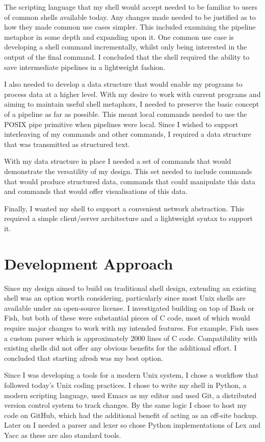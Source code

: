 \documentclass[12pt,twoside,notitlepage]{report}
\begin{document}
The scripting language that my shell would accept needed to be
familiar to users of common shells available today. Any changes made
needed to be justified as to how they made common use cases
simpler. This included examining the pipeline metaphor in some depth
and expanding upon it. One common use case is developing a shell
command incrementally, whilst only being interested in the output of
the final command. I concluded that the shell required the ability to
save intermediate pipelines in a lightweight fashion.

I also needed to develop a data structure that would enable my
programs to process data at a higher level. With my desire to work
with current programs and aiming to maintain useful shell metaphors, I
needed to preserve the basic concept of a pipeline as far as
possible. This meant local commands needed to use the POSIX pipe
primitive when pipelines were local. Since I wished to support
interleaving of my commands and other commands, I required a data
structure that was transmitted as structured text.

With my data structure in place I needed a set of commands that would
demonstrate the versatility of my design. This set needed to include commands
that would produce structured data, commands that could manipulate this data and
commands that would offer visualisations of this data.

Finally, I wanted my shell to support a convenient network abstraction. This
required a simple client/server architecture and a lightweight syntax to
support it.

\section{Development Approach}
Since my design aimed to build on traditional shell design, extending
an existing shell was an option worth considering, particularly since
most Unix shells are available under an open-source license. I
investigated building on top of Bash or Fish, but both of these were
substantial pieces of C code, most of which would require major
changes to work with my intended features. For example, Fish uses a
custom parser which is approximately 2000 lines of C code. Compatibility
with existing shells did not offer any obvious benefits for the
additional effort. I concluded that starting afresh was my best
option.

Since I was developing a tools for a modern Unix system, I chose a workflow that
followed today's Unix coding practices. I chose to write my shell in Python, a
modern scripting language, used Emacs as my editor and used Git, a distributed
version control system to track changes. By the same logic I chose to host my
code on GitHub, which had the additional benefit of acting as an off-site
backup. Later on I needed a parser and lexer so chose Python implementations of
Lex and Yacc as these are also standard tools.
\end{document}
